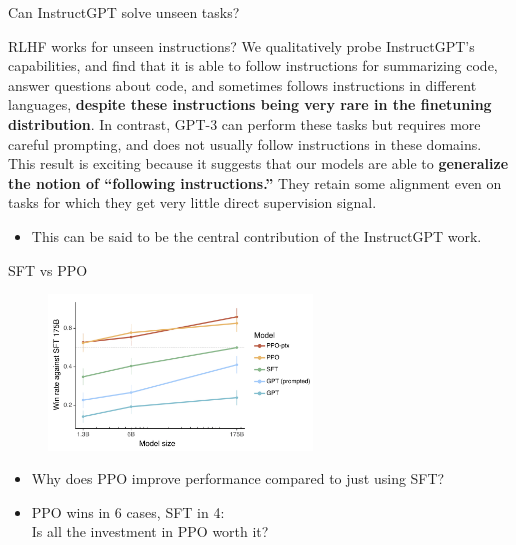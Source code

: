 \begin{vbframe}{Can InstructGPT solve unseen tasks?}



\begin{block}{RLHF works for unseen instructions?}
We qualitatively probe InstructGPT’s capabilities, and find
that it is able to follow instructions for summarizing code,
answer questions about code, and sometimes follows
instructions in different languages, \textbf{despite these
instructions being very rare in the finetuning
distribution}. In contrast, GPT-3 can perform these tasks but
requires more careful prompting, and does not usually follow
instructions in these domains. This result is exciting
because it suggests that our models are able to \textbf{generalize
the notion of “following instructions.”} They retain some
alignment even on tasks for which they get very little
direct supervision signal.
\end{block}


\begin{itemize}
	\item This can be said to be the central contribution
	of the InstructGPT work.
\end{itemize}

\vfill


\end{vbframe}




\begin{vbframe}{SFT vs PPO}

\vfill

\begin{figure}
\centering
\includegraphics[width = 7cm]{figure/mainresult.png}
\end{figure}

\begin{itemize}
        \item \ques Why does PPO improve performance compared to
        just using SFT?
        \item PPO wins in 6 cases, SFT in 4:\\ Is all the
        investment in PPO worth it?
\end{itemize}

\vfill

\end{vbframe}


